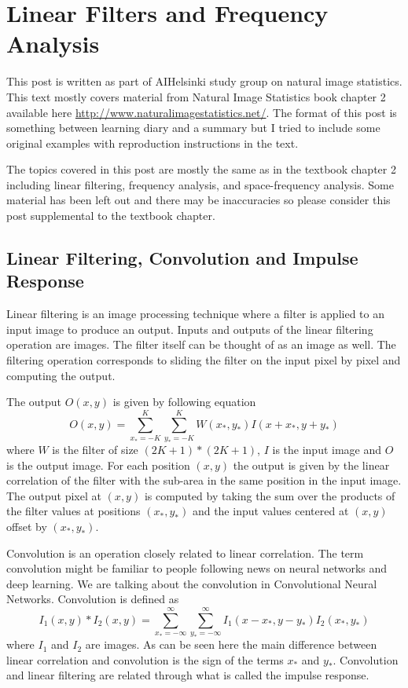 \documentclass[]{article}
\begin{document}
\section{Linear Filters and Frequency Analysis}
\label{linear-filters-and-frequency-analysis}
This post is written as part of AIHelsinki study group on natural image
statistics. This text mostly covers material from Natural Image Statistics book
chapter 2 available here \url{http://www.naturalimagestatistics.net/}. The
format of this post is something between learning diary and a summary but I
tried to include some original examples with reproduction instructions in the
text.

The topics covered in this post are mostly the same as in the textbook chapter
2 including linear filtering, frequency analysis, and space-frequency analysis.
Some material has been left out and there may be inaccuracies so please consider
this post supplemental to the textbook chapter.

\subsection{Linear Filtering, Convolution and Impulse Response}
\label{linear-filtering}
Linear filtering is an image processing technique where a filter is applied to
an input image to produce an output. Inputs and outputs of the linear filtering
operation are images. The filter itself can be thought of as an image as well.
The filtering operation corresponds to sliding the filter on the input pixel by
pixel and computing the output. 

The output $O(x,y)$ is given by following equation
\begin{equation}
  \label{eq:linear-filtering}
  O(x,y) = \sum_{x_*=-K}^{K}\sum_{y_*=-K}^{K}{W(x_*,y_*)I(x+x_*,y+y_*)}
\end{equation}
where $W$ is the filter of size $(2K+1)*(2K+1)$, $I$ is the input image and $O$
is the output image. For each position $(x,y)$ the output is given by the
linear correlation of the filter with the sub-area in the same position in the
input image. The output pixel at $(x,y)$ is computed by taking the sum over the
products of the filter values at positions $(x_*,y_*)$ and the input values
centered at $(x,y)$ offset by $(x_*,y_*)$.

Convolution is an operation closely related to linear correlation. The term
convolution might be familiar to people following news on neural networks and
deep learning. We are talking about the convolution in Convolutional Neural
Networks. Convolution is defined as
\begin{equation}
  I_1(x,y) \ast I_2(x,y) = \sum_{x_*=-\infty}^{\infty}\sum_{y_*=-\infty}^{\infty}{I_1(x-x_*,y-y_*)I_2(x_*,y_*)}
\end{equation}
where $I_1$ and $I_2$ are images. As can be seen here the main difference
between linear correlation and convolution is the sign of the terms $x_*$ and
$y_*$. Convolution and linear filtering are related through what is called the
impulse response.
\end{document}
